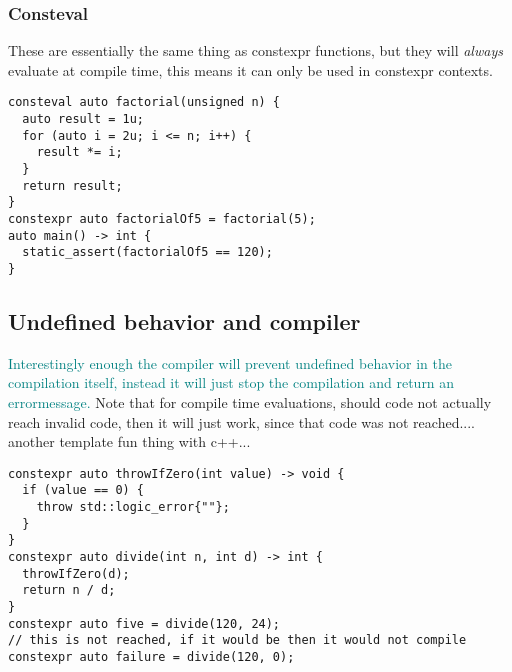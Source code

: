 \documentclass[main.tex,fontsize=8pt,paper=a4,paper=portrait,DIV=calc,]{scrartcl}
\begin{document}
\subsubsection{Consteval}
These are essentially the same thing as constexpr functions, but they will \emph{always} evaluate at compile time, this means it can only be used in constexpr contexts.
\begin{lstlisting}
consteval auto factorial(unsigned n) {
  auto result = 1u;
  for (auto i = 2u; i <= n; i++) {
    result *= i;
  }
  return result;
}
constexpr auto factorialOf5 = factorial(5);
auto main() -> int {
  static_assert(factorialOf5 == 120);
}
\end{lstlisting}

\subsection{Undefined behavior and compiler}
\textcolor{teal}{Interestingly enough the compiler will prevent undefined behavior in the compilation itself, instead it will just stop the compilation and return an errormessage.}\newline
Note that for compile time evaluations, should code not actually reach invalid code, then it will just work, since that code was not reached.... another template fun thing with c++...
\begin{lstlisting}
constexpr auto throwIfZero(int value) -> void {
  if (value == 0) {
    throw std::logic_error{""};
  }
}
constexpr auto divide(int n, int d) -> int {
  throwIfZero(d);
  return n / d;
}
constexpr auto five = divide(120, 24);
// this is not reached, if it would be then it would not compile
constexpr auto failure = divide(120, 0);
\end{lstlisting}
\end{document}
